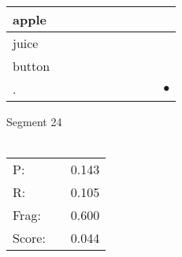 \documentclass[landscape]{article}
\newcommand{\ssp}{\hspace{2pt}}
\newcommand{\mex}{\cellcolor{g}$\bullet$}
\begin{document}
\begin{tabular}{|l|p{10pt}|p{10pt}|p{10pt}|p{10pt}|p{10pt}|p{10pt}|p{10pt}|p{10pt}|p{10pt}|}
\hline
\ssp apple \ssp&\hspace{2pt}&\hspace{2pt}&\hspace{2pt}&\hspace{2pt}&\hspace{2pt}&\hspace{2pt}&\hspace{2pt}&\hspace{2pt}&\hspace{2pt}\\
\hline
\ssp juice \ssp&\hspace{2pt}&\hspace{2pt}&\hspace{2pt}&\hspace{2pt}&\hspace{2pt}&\hspace{2pt}&\hspace{2pt}&\hspace{2pt}&\hspace{2pt}\\
\hline
\ssp button \ssp&\hspace{2pt}&\hspace{2pt}&\hspace{2pt}&\hspace{2pt}&\hspace{2pt}&\hspace{2pt}&\hspace{2pt}&\hspace{2pt}&\hspace{2pt}\\
\hline
\ssp \cellcolor{ref8}. \ssp&\hspace{2pt}&\hspace{2pt}&\hspace{2pt}&\hspace{2pt}&\hspace{2pt}&\hspace{2pt}&\hspace{2pt}&\hspace{2pt}&\hspace{2pt}\mex\\
\hline
\end{tabular}

\vspace{6pt}
\noindent Segment 24\\\\
\noindent\begin{tabular}{lm{12pt}r}
\hline
P:&&0.143\\
R:&&0.105\\
Frag:&&0.600\\
Score:&&0.044\\
\end{tabular}
\end{document}
